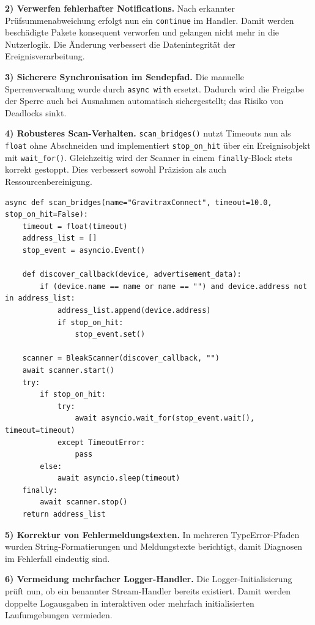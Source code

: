 \textbf{2) Verwerfen fehlerhafter Notifications.}
Nach erkannter Prüfsummenabweichung erfolgt nun ein \texttt{continue} im Handler.
Damit werden beschädigte Pakete konsequent verworfen und gelangen nicht mehr in die Nutzerlogik.
Die Änderung verbessert die Datenintegrität der Ereignisverarbeitung.

\textbf{3) Sicherere Synchronisation im Sendepfad.}
Die manuelle Sperrenverwaltung wurde durch \texttt{async with} ersetzt.
Dadurch wird die Freigabe der Sperre auch bei Ausnahmen automatisch sichergestellt; das Risiko von Deadlocks sinkt.

\textbf{4) Robusteres Scan-Verhalten.}
\texttt{scan\_bridges()} nutzt Timeouts nun als \texttt{float} ohne Abschneiden und implementiert \texttt{stop\_on\_hit} über ein Ereignisobjekt mit \texttt{wait\_for()}.
Gleichzeitig wird der Scanner in einem \texttt{finally}-Block stets korrekt gestoppt.
Dies verbessert sowohl Präzision als auch Ressourcenbereinigung.

\begin{listing}[ht]
\caption{Auszug: Überarbeitetes Scan-Verhalten mit frühem Abbruch}
\label{lst:scan-bridges}
\begin{verbatim}
async def scan_bridges(name="GravitraxConnect", timeout=10.0, stop_on_hit=False):
	timeout = float(timeout)
	address_list = []
	stop_event = asyncio.Event()

	def discover_callback(device, advertisement_data):
		if (device.name == name or name == "") and device.address not in address_list:
			address_list.append(device.address)
			if stop_on_hit:
				stop_event.set()

	scanner = BleakScanner(discover_callback, "")
	await scanner.start()
	try:
		if stop_on_hit:
			try:
				await asyncio.wait_for(stop_event.wait(), timeout=timeout)
			except TimeoutError:
				pass
		else:
			await asyncio.sleep(timeout)
	finally:
		await scanner.stop()
	return address_list
\end{verbatim}
\end{listing}

\textbf{5) Korrektur von Fehlermeldungstexten.}
In mehreren TypeError-Pfaden wurden String-Formatierungen und Meldungstexte berichtigt, damit Diagnosen im Fehlerfall eindeutig sind.

\textbf{6) Vermeidung mehrfacher Logger-Handler.}
Die Logger-Initialisierung prüft nun, ob ein benannter Stream-Handler bereits existiert.
Damit werden doppelte Logausgaben in interaktiven oder mehrfach initialisierten Laufumgebungen vermieden.

